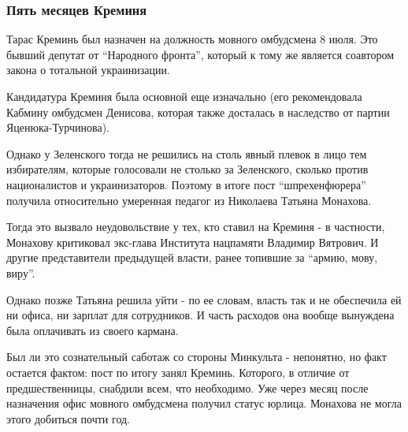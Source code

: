  
 
 
 
 

\subsubsection{Пять месяцев Креминя}
\label{sec:02_12_2020.news.ua.strana.venk_victoria.1.mova_shtrafy_ukrainizacia.5_mesjacev_kreminja}

Тарас Креминь был назначен на должность мовного омбудсмена 8 июля. Это бывший
депутат от \enquote{Народного фронта}, который к тому же является соавтором закона о
тотальной украинизации.

Кандидатура Креминя была основной еще изначально (его рекомендовала Кабмину
омбудсмен Денисова, которая также досталась в наследство от партии
Яценюка-Турчинова).

Однако у Зеленского тогда не решились на столь явный плевок в лицо тем
избирателям, которые голосовали не столько за Зеленского, сколько против
националистов и украинизаторов. Поэтому в итоге пост \enquote{шпрехенфюрера} получила
относительно умеренная педагог из Николаева Татьяна Монахова. 

Тогда это вызвало неудовольствие у тех, кто ставил на Креминя - в частности,
Монахову критиковал экс-глава Института нацпамяти Владимир Вятрович. И другие
представители предыдущей власти, ранее топившие за \enquote{армию, мову, виру}. 

Однако позже Татьяна решила уйти - по ее словам, власть так и не обеспечила ей
ни офиса, ни зарплат для сотрудников. И часть расходов она вообще вынуждена
была оплачивать из своего кармана. 

Был ли это сознательный саботаж со стороны Минкульта - непонятно, но факт
остается фактом: пост по итогу занял Креминь. Которого, в отличие от
предшественницы, снабдили всем, что необходимо. Уже через месяц после
назначения офис мовного омбудсмена получил статус юрлица. Монахова не могла
этого добиться почти год. 

